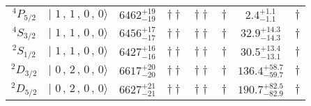 \begin{tabular}{c| c c c c c c c}
$^{4}P_{5/2}$ & $\vert \,\,1\,,\,1\,,\,0\,,\,0 \rangle $ & $6462^{+19}_{-19}$ & $\dagger\dagger$ & $\dagger\dagger$ & $\dagger$ & $2.4^{+1.1}_{-1.1}$ & $\dagger$ \\ 
$^{4}S_{3/2}$ & $\vert \,\,1\,,\,1\,,\,0\,,\,0 \rangle $ & $6456^{+17}_{-17}$ & $\dagger\dagger$ & $\dagger\dagger$ & $\dagger$ & $32.9^{+14.3}_{-14.3}$ & $\dagger$ \\ 
$^{2}S_{1/2}$ & $\vert \,\,1\,,\,1\,,\,0\,,\,0 \rangle $ & $6427^{+16}_{-16}$ & $\dagger\dagger$ & $\dagger\dagger$ & $\dagger$ & $30.5^{+13.4}_{-13.1}$ & $\dagger$ \\ 
$^{2}D_{3/2}$ & $\vert \,\,0\,,\,2\,,\,0\,,\,0 \rangle $ & $6617^{+20}_{-20}$ & $\dagger\dagger$ & $\dagger\dagger$ & $\dagger$ & $136.4^{+58.7}_{-59.7}$ & $\dagger$ \\ 
$^{2}D_{5/2}$ & $\vert \,\,0\,,\,2\,,\,0\,,\,0 \rangle $ & $6627^{+21}_{-21}$ & $\dagger\dagger$ & $\dagger\dagger$ & $\dagger$ & $190.7^{+82.5}_{-82.9}$ & $\dagger$ \\ 
\hline \hline
\end{tabular}
